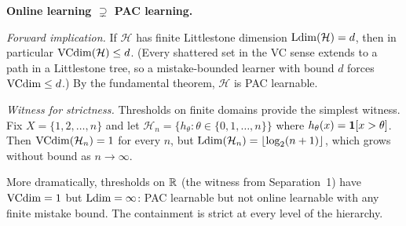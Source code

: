 
\begin{separation}
\textbf{Online learning $\supsetneq$ PAC learning.}

\medskip\noindent
\emph{Forward implication.}
If $\mathcal{H}$ has finite Littlestone dimension $\mathrm{Ldim}(\mathcal{H})
= d$, then in particular $\mathrm{VCdim}(\mathcal{H}) \leq d$. (Every shattered
set in the VC sense extends to a path in a Littlestone tree, so a
mistake-bounded learner with bound $d$ forces $\mathrm{VCdim} \leq d$.) By the
fundamental theorem, $\mathcal{H}$ is PAC learnable.

\medskip\noindent
\emph{Witness for strictness.}
Thresholds on finite domains provide the simplest witness. Fix
$X = \{1, 2, \ldots, n\}$ and let $\mathcal{H}_n = \{h_\theta :
\theta \in \{0, 1, \ldots, n\}\}$ where $h_\theta(x) = \mathbf{1}[x >
\theta]$. Then $\mathrm{VCdim}(\mathcal{H}_n) = 1$ for every $n$, but
$\mathrm{Ldim}(\mathcal{H}_n) = \lfloor \log_2(n+1) \rfloor$, which grows
without bound as $n \to \infty$.

More dramatically, thresholds on $\mathbb{R}$ (the witness from Separation~1)
have $\mathrm{VCdim} = 1$ but $\mathrm{Ldim} = \infty$: PAC learnable but not online
learnable with any finite mistake bound. The containment is strict at
every level of the hierarchy.

\hfill\cite{Littlestone1988}
\end{separation}


